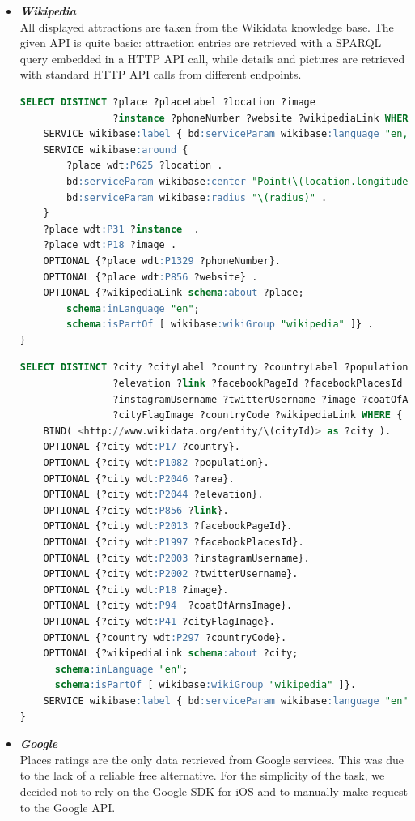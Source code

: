 \documentclass[a4paper, 11pt, parskip=half]{scrreprt}
\theoremstyle{definition}
\begin{document}
\begin{itemize}
	\item \textit{\textbf{Wikipedia}} \\
	All displayed attractions are taken from the Wikidata knowledge base. The given API is quite basic: attraction entries are retrieved with a SPARQL query embedded in a HTTP API call, while details and pictures are retrieved with standard HTTP API calls from different endpoints.
		
	\begin{lstlisting}[language=sql, caption={SPARQL query for attraction retrieving}, captionpos=b]
SELECT DISTINCT ?place ?placeLabel ?location ?image 
                ?instance ?phoneNumber ?website ?wikipediaLink WHERE {
    SERVICE wikibase:label { bd:serviceParam wikibase:language "en, it" }
    SERVICE wikibase:around {
        ?place wdt:P625 ?location .
        bd:serviceParam wikibase:center "Point(\(location.longitude) \(location.latitude))"^^geo:wktLiteral .
        bd:serviceParam wikibase:radius "\(radius)" .
    }
    ?place wdt:P31 ?instance  .
    ?place wdt:P18 ?image .
    OPTIONAL {?place wdt:P1329 ?phoneNumber}.
    OPTIONAL {?place wdt:P856 ?website} .
    OPTIONAL {?wikipediaLink schema:about ?place;
        schema:inLanguage "en";
        schema:isPartOf [ wikibase:wikiGroup "wikipedia" ]} .
}
	\end{lstlisting}
		
	\begin{lstlisting}[language=sql, caption={SPARQL query for city detail retrieving}, captionpos=b]
SELECT DISTINCT ?city ?cityLabel ?country ?countryLabel ?population ?area
                ?elevation ?link ?facebookPageId ?facebookPlacesId
                ?instagramUsername ?twitterUsername ?image ?coatOfArmsImage
                ?cityFlagImage ?countryCode ?wikipediaLink WHERE {
    BIND( <http://www.wikidata.org/entity/\(cityId)> as ?city ).
    OPTIONAL {?city wdt:P17 ?country}.
    OPTIONAL {?city wdt:P1082 ?population}.
    OPTIONAL {?city wdt:P2046 ?area}.
    OPTIONAL {?city wdt:P2044 ?elevation}.
    OPTIONAL {?city wdt:P856 ?link}.
    OPTIONAL {?city wdt:P2013 ?facebookPageId}.
    OPTIONAL {?city wdt:P1997 ?facebookPlacesId}.
    OPTIONAL {?city wdt:P2003 ?instagramUsername}.
    OPTIONAL {?city wdt:P2002 ?twitterUsername}.
    OPTIONAL {?city wdt:P18 ?image}.
    OPTIONAL {?city wdt:P94  ?coatOfArmsImage}.
    OPTIONAL {?city wdt:P41 ?cityFlagImage}.
    OPTIONAL {?country wdt:P297 ?countryCode}.
    OPTIONAL {?wikipediaLink schema:about ?city;
      schema:inLanguage "en";
      schema:isPartOf [ wikibase:wikiGroup "wikipedia" ]}.
    SERVICE wikibase:label { bd:serviceParam wikibase:language "en". }
}
	\end{lstlisting}
		
	\item \textit{\textbf{Google}} \\
	Places ratings are the only data retrieved from Google services. This was due to the lack of a reliable free alternative. For the simplicity of the task, we decided not to rely on the Google SDK for iOS and to manually make request to the Google API.
\end{itemize}
\end{document}
